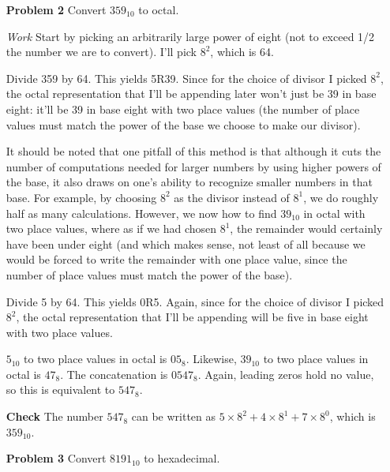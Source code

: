 \documentclass[12pt]{article}
\begin{document}
\begin{enumerate}
  \item[\textbf{Problem 2}] Convert $359_{10}$ to octal.
\end{enumerate}

\begin{enumerate}
  \item[\textit{Work}] Start by picking an arbitrarily large power of eight (not to exceed 1/2 the number we are to convert). I'll pick $8^2$, which is 64.
  \item[] Divide 359 by 64. This yields 5R39. Since for the choice of divisor I picked $8^2$, the octal representation that I'll be appending later won't just be 39 in base eight: it'll be 39 in base eight with two place values (the number of place values must match the power of the base we choose to make our divisor).
  \item[] It should be noted that one pitfall of this method is that although it cuts the number of computations needed for larger numbers by using higher powers of the base, it also draws on one's ability to recognize smaller numbers in that base. For example, by choosing $8^2$ as the divisor instead of $8^1$, we do roughly half as many calculations. However, we now how to find $39_{10}$ in octal with two place values, where as if we had chosen $8^1$, the remainder would certainly have been under eight (and which makes sense, not least of all because we would be forced to write the remainder with one place value, since the number of place values must match the power of the base).
  \item[] Divide 5 by 64. This yields 0R5. Again, since for the choice of divisor I picked $8^2$, the octal representation that I'll be appending will be five in base eight with two place values.
  \item[] $5_{10}$ to two place values in octal is $05_8$. Likewise, $39_{10}$ to two place values in octal is $47_8$. The concatenation is $0547_8$. Again, leading zeros hold no value, so this is equivalent to $547_8$.
  \item[\textbf{Check}] The number $547_8$ can be written as $5\times8^{2}+4\times8^1+7\times8^0$, which is $359_{10}$.
\end{enumerate}

\begin{enumerate}
  \item[\textbf{Problem 3}] Convert $8191_{10}$ to hexadecimal.
\end{enumerate}
\end{document}
